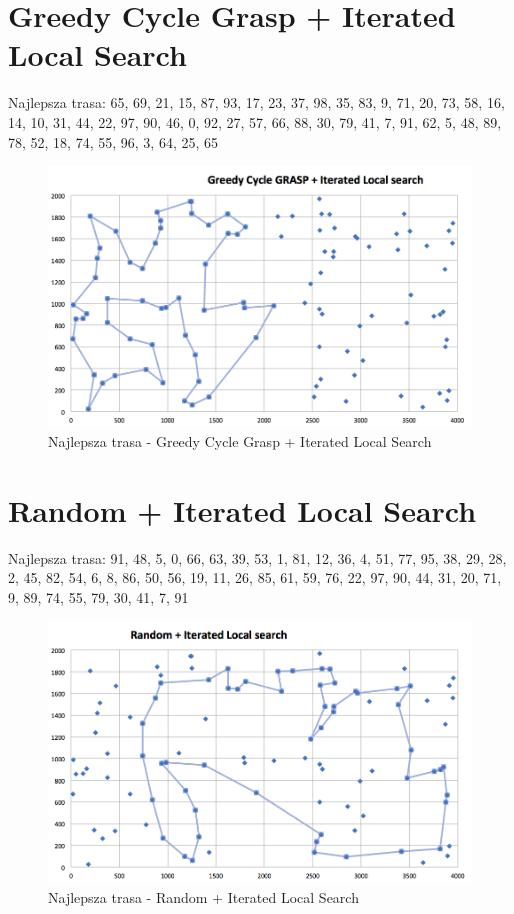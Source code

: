 \documentclass[a4paper 10pt]{article}
\begin{document}
\newpage
\section{Greedy Cycle Grasp + Iterated Local Search}
Najlepsza trasa: 65, 69, 21, 15, 87, 93, 17, 23, 37, 98, 35, 83, 9, 71, 20, 73, 58, 16, 14, 10, 31, 44, 22, 97, 90, 46, 0, 92, 27, 57, 66, 88, 30, 79, 41, 7, 91, 62, 5, 48, 89, 78, 52, 18, 74, 55, 96, 3, 64, 25, 65 

\begin{figure} [H]
\centering
\includegraphics[angle=0,width = 1\textwidth, height=!]{images/GCG_ILS.png}
\caption{Najlepsza trasa - Greedy Cycle Grasp + Iterated Local Search}
\label{Rys. NN}
\end{figure}

\newpage
\section{Random + Iterated Local Search}
Najlepsza trasa: 91, 48, 5, 0, 66, 63, 39, 53, 1, 81, 12, 36, 4, 51, 77, 95, 38, 29, 28, 2, 45, 82, 54, 6, 8, 86, 50, 56, 19, 11, 26, 85, 61, 59, 76, 22, 97, 90, 44, 31, 20, 71, 9, 89, 74, 55, 79, 30, 41, 7, 91 

\begin{figure} [H]
\centering
\includegraphics[angle=0,width = 1\textwidth, height=!]{images/Random_ILS.png}
\caption{Najlepsza trasa - Random + Iterated Local Search}
\label{Rys. NN}
\end{figure}
\end{document}
